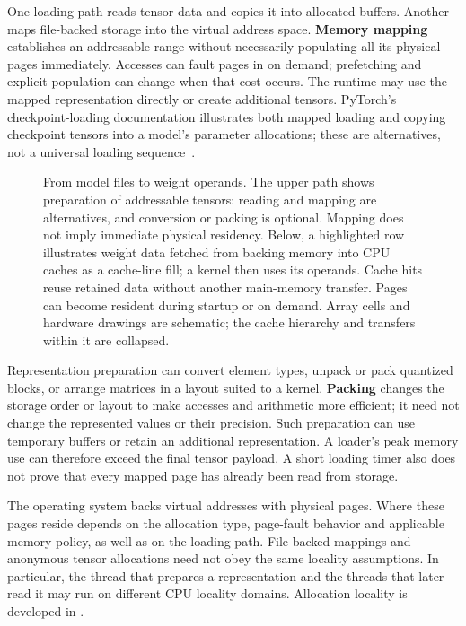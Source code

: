 One loading path reads tensor data and copies it into allocated buffers.
Another maps file-backed storage into the virtual address space.
\textbf{Memory mapping} establishes an addressable range without
necessarily populating all its physical pages immediately.  Accesses
can fault pages in on demand; prefetching and explicit population can
change when that cost occurs.  The runtime may use the mapped
representation directly or create additional tensors.  PyTorch's
checkpoint-loading documentation illustrates both mapped loading and
copying checkpoint tensors into a model's parameter allocations; these
are alternatives, not a universal loading sequence~\cite{pytorchloading2026}.

\begin{figure}[htbp]
\centering

\caption{From model files to weight operands.  The upper path shows
preparation of addressable tensors: reading and mapping are alternatives,
and conversion or packing is optional.  Mapping does not imply immediate
physical residency.  Below, a highlighted row illustrates weight data
fetched from backing memory into CPU caches as a cache-line fill; a
kernel then uses its operands.  Cache hits reuse retained data without
another main-memory transfer.  Pages can become resident during startup
or on demand.  Array cells and hardware drawings are schematic; the cache
hierarchy and transfers within it are collapsed.}
\label{fig:weight-loading}
\end{figure}
\FloatBarrier

Representation preparation can convert element types, unpack or pack
quantized blocks, or arrange matrices in a layout suited to a kernel.
\textbf{Packing} changes the storage order or layout to make accesses
and arithmetic more efficient; it need not change the represented
values or their precision.  Such preparation can use temporary buffers
or retain an additional representation.  A loader's peak memory use can
therefore exceed the final tensor payload.  A short loading timer also
does not prove that every mapped page has already been read from storage.

The operating system backs virtual addresses with physical pages.
Where these pages reside depends on the allocation type, page-fault
behavior and applicable memory policy, as well as on the loading path.
File-backed mappings and anonymous tensor allocations need not obey the
same locality assumptions.  In particular, the thread that prepares a
representation and the threads that later read it may run on different
CPU locality domains.  Allocation locality is developed in
.

